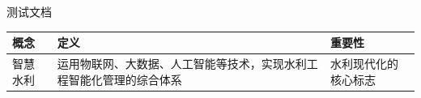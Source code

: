\documentclass[12pt,a4paper]{book}
\begin{document}
测试文档

\begin{longtable}[]{@{}
  >{\raggedright\arraybackslash}p{}
  >{\raggedright\arraybackslash}p{}
  >{\raggedright\arraybackslash}p{}@{}}
\toprule
概念 & 定义 & 重要性 \\
\midrule
智慧水利 & 运用物联网、大数据、人工智能等技术，实现水利工程智能化管理的综合体系 & 水利现代化的核心标志 \\
\bottomrule
\end{longtable}
\end{document}
